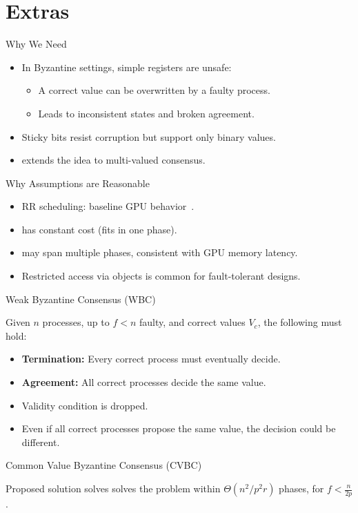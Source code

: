 \section*{Extras}

\begin{frame}{Why We Need \BVCAS}
\begin{itemize}
  \item In Byzantine settings, simple registers are unsafe:
    \begin{itemize}
      \item A correct value can be overwritten by a faulty process.
      \item Leads to inconsistent states and broken agreement.
    \end{itemize}
  \item Sticky bits resist corruption but support only binary values.
  \item \BVCAS extends the idea to multi-valued consensus.
\end{itemize}
\end{frame}



\begin{frame}{Why Assumptions are Reasonable}
\begin{itemize}
  \item RR scheduling: baseline GPU behavior~.
  \item \Fwrite{} has constant cost (fits in one phase).
  \item \Fview{} may span multiple phases, consistent with GPU memory latency.
  \item Restricted access via objects is common for fault-tolerant designs.
\end{itemize}
\end{frame}

\begin{frame}{Weak Byzantine Consensus (WBC)}
\begin{definition}[\wbc] 
	Given $n$ processes, up to $f<n$ faulty, and correct values $V_c$, the following must hold:
	\begin{itemize}
		\item \textbf{Termination: } Every correct process must eventually decide.
		\item \textbf{Agreement: } All correct processes decide the same value.
	\end{itemize}
\end{definition}
\begin{itemize}
  \item Validity condition is dropped.
  \item Even if all correct processes propose the same value, the decision could be different.
\end{itemize}
\end{frame}

\begin{frame}{Common Value Byzantine Consensus (CVBC)}
\begin{theorem}[\cvbc] 
Proposed solution solves solves the \cvbc problem within $\Theta(n^2/p^2r)$ phases, for $f< \frac{n}{2p}$.
\end{theorem}
\end{frame}

